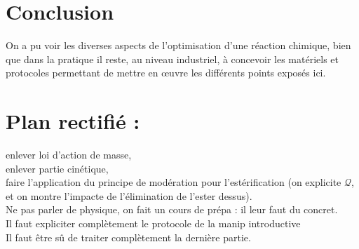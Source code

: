 \documentclass[12pt,prb,aps,epsf]{report}
\begin{document}
\section{Conclusion}
On a pu voir les diverses aspects de l'optimisation d'une réaction chimique, bien que dans la pratique il reste, au niveau industriel, à concevoir les matériels et protocoles permettant de mettre en œuvre les différents points exposés ici.

\section{Plan rectifié :}
enlever loi d'action de masse,\\ 

enlever partie cinétique,\\
 
faire l'application du principe de modération pour l'estérification (on explicite $\mathcal{Q}$, et on montre l'impacte de l'élimination de l'ester dessus).\\

Ne pas parler de physique, on fait un cours de prépa : il leur faut du concret.\\

Il faut expliciter complètement le protocole de la manip introductive\\

Il faut être sû de traiter complètement la dernière partie.
\end{document}
